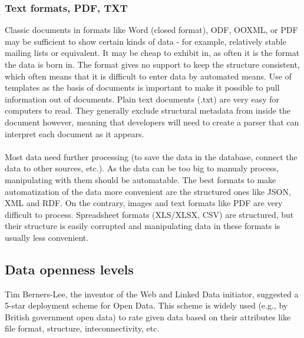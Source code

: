 \documentclass[thesis=B,english]{FITthesis}[2012/06/26]
\begin{document}
		\subsubsection{Text formats, PDF, TXT}
		Classic documents in formats like Word (closed format), ODF, OOXML, or PDF may be sufficient to show certain kinds of data - for example, relatively stable mailing lists or equivalent. It may be cheap to exhibit in, as often it is the format the data is born in. The format gives no support to keep the structure consistent, which often means that it is difficult to enter data by automated means. Use of templates as the basis of documents is important to make it possible to pull information out of documents.
Plain text documents (.txt) are very easy for computers to read. They generally exclude structural metadata from inside the document however, meaning that developers will need to create a parser that can interpret each document as it appears.
\paragraph{}Most data need further processing (to save the data in the database, connect the data to other sources, etc.). As the data can be too big to manualy process, manipulating with them should be automatable. The best formats to make automatization of the data more convenient are the structured ones like JSON, XML and RDF. On the contrary, images and text formats like PDF are very difficult to process. Spreadsheet formats (XLS/XLSX, CSV) are structured, but their structure is easily corrupted and manipulating data in these formats is usually less convenient.

	\subsection{Data openness levels}
	Tim Berners-Lee, the inventor of the Web and Linked Data initiator, suggested a 5-star deployment scheme for Open Data. This scheme is widely used (e.g., by British government open data) to rate given data based on their attributes like file format, structure, inteconnectivity, etc.
\end{document}
